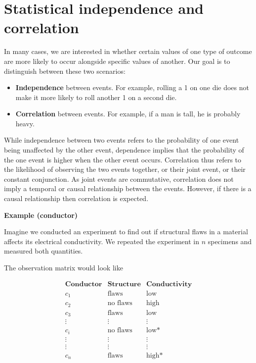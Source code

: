 \documentclass[
]{book}
\begin{document}
\hypertarget{statistical-independence-and-correlation}{%
\section{Statistical independence and correlation}\label{statistical-independence-and-correlation}}

In many cases, we are interested in whether certain values of one type of outcome are more likely to occur alongside specific values of another. Our goal is to distinguish between these two scenarios:

\begin{itemize}
\item
  \textbf{Independence} between events. For example, rolling a 1 on one die does not make it more likely to roll another 1 on a second die.
\item
  \textbf{Correlation} between events. For example, if a man is tall, he is probably heavy.
\end{itemize}

While independence between two events refers to the probability of one event being unaffected by the other event, dependence implies that the probability of the one event is higher when the other event occurs. Correlation thus refers to the likelihood of observing the two events together, or their joint event, or their constant conjunction. As joint events are commutative, correlation does not imply a temporal or causal relationship between the events. However, if there is a causal relationship then correlation is expected.

\textbf{Example (conductor)}

Imagine we conducted an experiment to find out if structural flaws in a material affects its electrical conductivity. We repeated the experiment in \(n\) specimens and measured both quantities.

The observation matrix would look like

\[
\begin{array}{ccc}
\mathbf{Conductor} & \mathbf{Structure} & \mathbf{Conductivity} \\ 
c_1 & \text{flaws} & \text{low} \\ 
c_2 & \text{no flaws} & \text{high} \\
c_3 & \text{flaws} & \text{low} \\
\vdots & \vdots & \vdots \\ 
c_i & \text{no flaws} & \text{low*} \\ 
\vdots & \vdots & \vdots \\ 
\vdots & \vdots & \vdots \\ 
c_n & \text{flaws} & \text{high*} \\ 
\end{array}
\]
\end{document}
